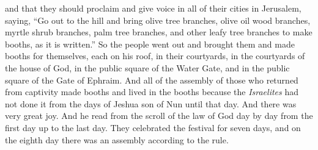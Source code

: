 \begin{biblechapter}
\verse and that they should proclaim and give voice in all of their cities in Jerusalem, saying, “Go out to the hill and bring olive tree branches, olive oil wood branches, myrtle shrub branches, palm tree branches, and other leafy tree branches to make booths, as it is written.”
\verse So the people went out and brought them and made booths for themselves, each on his roof, in their courtyards, in the courtyards of the house of God, in the public square of the Water Gate, and in the public square of the Gate of Ephraim.
\verse And all of the assembly of those who returned from captivity made booths and lived in the booths because the \textit{Israelites} had not done it from the days of Jeshua son of Nun until that day. And there was very great joy.
\verse And he read from the scroll of the law of God day by day from the first day up to the last day. They celebrated the festival for seven days, and on the eighth day there was an assembly according to the rule.
\end{biblechapter}

